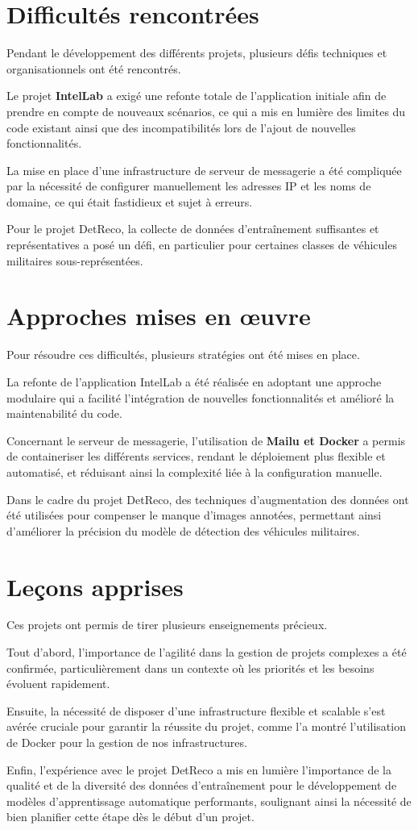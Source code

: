
\section{Difficultés rencontrées}
Pendant le développement des différents projets, plusieurs défis techniques et organisationnels ont été rencontrés.

Le projet \textbf{IntelLab} a exigé une refonte totale de l'application initiale afin de prendre en compte de nouveaux scénarios, ce qui a mis en lumière des limites du code existant ainsi que des incompatibilités lors de l'ajout de nouvelles fonctionnalités.

La mise en place d'une infrastructure de serveur de messagerie a été compliquée par la nécessité de configurer manuellement les adresses IP et les noms de domaine, ce qui était fastidieux et sujet à erreurs.

Pour le projet DetReco, la collecte de données d'entraînement suffisantes et représentatives a posé un défi, en particulier pour certaines classes de véhicules militaires sous-représentées.

\section{Approches mises en œuvre}
Pour résoudre ces difficultés, plusieurs stratégies ont été mises en place.

La refonte de l'application IntelLab a été réalisée en adoptant une approche modulaire qui a facilité l'intégration de nouvelles fonctionnalités et amélioré la maintenabilité du code.

Concernant le serveur de messagerie, l'utilisation de \textbf{Mailu et Docker} a permis de containeriser les différents services, rendant le déploiement plus flexible et automatisé, et réduisant ainsi la complexité liée à la configuration manuelle.

Dans le cadre du projet DetReco, des techniques d'augmentation des données ont été utilisées pour compenser le manque d'images annotées, permettant ainsi d'améliorer la précision du modèle de détection des véhicules militaires.

\section{Leçons apprises}
Ces projets ont permis de tirer plusieurs enseignements précieux.

Tout d'abord, l'importance de l'agilité dans la gestion de projets complexes a été confirmée, particulièrement dans un contexte où les priorités et les besoins évoluent rapidement.

Ensuite, la nécessité de disposer d'une infrastructure flexible et scalable s'est avérée cruciale pour garantir la réussite du projet, comme l'a montré l'utilisation de Docker pour la gestion de nos infrastructures.

Enfin, l'expérience avec le projet DetReco a mis en lumière l'importance de la qualité et de la diversité des données d'entraînement pour le développement de modèles d'apprentissage automatique performants, soulignant ainsi la nécessité de bien planifier cette étape dès le début d'un projet.
